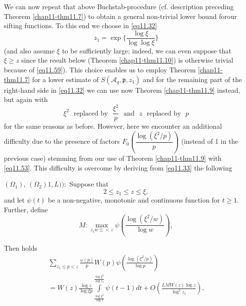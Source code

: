 We can now repeat that above Buchstab-procedure (cf. description
preceding Theorem \ref{chap11-thm11.7}) to obtain a general
non-trivial lower bound 
for\pageoriginale our sifting functions. To this end we choose in
\eqref{eq11.32}  
\begin{equation*}
z_1 =\exp \{ \frac{\log \xi} {\log \log \xi}\}\tag{11.52}\label{eq11.52}
\end{equation*} 
(and also assume $\xi$ to be sufficiently large; indeed, we can even
suppose that $\xi \ge z$ since the result below (Theorem
\ref{chap11-thm11.10}) is
otherwise trivial because of \eqref{eq11.59}). This choice enables us to
employ Theorem \ref{chap11-thm11.7}  for a lower estimate of  $S(\mathscr{A}_q,
\mathfrak{p}, z_1)$ and for the remaining part of the right-hand side
in \eqref{eq11.32} we  can use now Theorem \ref{chap11-thm11.9}
instead, but again with  
\begin{equation*}
\xi^2 \text{~ replaced by~ } \frac{\xi^2}{p} \text{~ and~ } z \text{~
  replaced by~ }p \tag{11.53}\label{eq11.53} 
\end{equation*} 
for the same reasons as before. However, here we encounter an
additional difficulty due to the presence of factors $F_0 (
\dfrac{\log(\xi^2 / p)}{p})$ (instead of 1 in the previous case) stemming
from our use of Theorem \ref{chap11-thm11.9} with \eqref{eq11.53}. 
This difficulty is overcome by deriving from \eqref{eq11.33} the following  

\begin{lemma}\label{chap11-lem11.3}%
$(\Omega_1)$, $(\Omega_2)1,L)):$ Suppose that
\begin{equation*}
2 \le z_1 \le z \le \xi,\tag{11.54}\label{eq11.54}
\end{equation*} 
and let $\psi (t)$ be a non-negative, monotonic and continuous
function for $t \ge 1$. Further, define 
\begin{equation*}
M: \max\limits_{z_1 w\le < z} \psi (\frac{\log (\xi^2 / w)} {\log
  w}),\tag{11.55}\label{eq11.55} 
\end{equation*}
\end{lemma}

Then holds 
\begin{gather*}
\sum_{z_1 \le p < z} \frac{\omega(p)}{p} W (p) \psi ( \frac{\log (
  \xi^2 / p)}{\log p})\\
= W(z) \frac{\log z}{\log \xi p} \int\limits^{\frac{\log \xi^2}{\log
  z_1}}_{\frac{\log \xi^2}{\log z}} \psi (t-1)dt+O ( 
\frac{LMW(z) \log z}{\log^2 z_1}).\tag{11.56}\label{eq11.56} 
\end{gather*}

